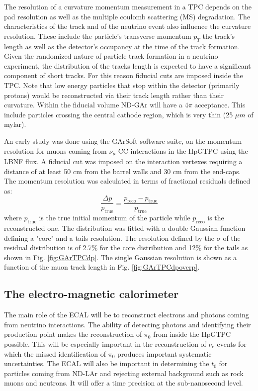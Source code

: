The resolution of a curvature momentum measurement in a TPC depends on the pad resolution as well as the multiple coulomb scattering (MS) degradation. The characteristics of the track and of the neutrino event also influence the curvature resolution. These include the particle's transverse momentum $p_T$ the track's length as well as the detector's occupancy at the time of the track formation. Given the randomized nature of particle track formation in a neutrino experiment, the distribution of the tracks length is expected to have a significant component of short tracks. For this reason fiducial cuts are imposed inside the TPC. Note that low energy particles that stop within the detector (primarily protons) would be reconstructed via their track length rather than their curvature. Within the fiducial volume ND-GAr will have a $4\pi$ acceptance. This include particles crossing the central cathode region, which is very thin (25 $\mu m$ of mylar).

An early study was done using the GArSoft software suite, on the momentum resolution for muons coming from $\nu_\mu$ CC interactions in the HpGTPC using the LBNF flux. A fiducial cut was imposed on the interaction vertexes requiring a distance of at least 50 cm from the barrel walls and 30 cm from the end-caps. The momentum resolution was calculated in terms of fractional residuals defined as:
    \begin{equation}
        \frac{\Delta p}{p_\textrm{true}} = \frac{p_\textrm{reco}-p_\textrm{true}}{p_\textrm{true}}
    \end{equation}
where $p_\textrm{true}$ is the true initial momentum of the particle while $p_\textrm{reco}$ is the reconstructed one. The distribution was fitted with a double Gaussian function defining a "core" and a tails resolution. The resolution defined by the $\sigma$ of the residual distribution is of 2.7\% for the core distribution and 12\% for the tails as shown in Fig. \ref{fig:GArTPCdp}. The single Gaussian resolution is shown as a function of the muon track length in Fig. \ref{fig:GArTPCdpoverp}.

\subsection{The electro-magnetic calorimeter}
The main role of the ECAL will be to reconstruct electrons and photons coming from neutrino interactions. The ability of detecting photons and identifying their production point makes the reconstruction of $\pi_0$ from inside the HpGTPC possible. This will be especially important in the reconstruction of $\nu_e$ events for which the missed identification of $\pi_0$ produces important systematic uncertainties. The ECAL will also be important in determining the $t_0$ for particles coming from ND-LAr and rejecting external background such as rock muons and neutrons. It will offer a time precision at the sub-nanosecond level.

